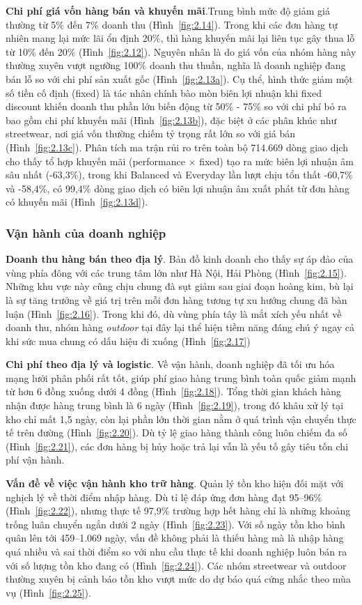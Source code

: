\documentclass{article}
\begin{document}
\textbf{Chi phí giá vốn hàng bán và khuyến mãi}.Trung bình mức độ giảm giá thường từ 5\% đến 7\% doanh thu (Hình~\ref{fig:2.14}). Trong khi các đơn hàng tự nhiên mang lại mức lãi ổn định 20\%, thì hàng khuyến mãi lại liên tục gây thua lỗ từ 10\% đến 20\% (Hình~\ref{fig:2.12}). Nguyên nhân là do giá vốn của nhóm hàng này thường xuyên vượt ngưỡng 100\% doanh thu thuần, nghĩa là doanh nghiệp đang bán lỗ so với chi phí sản xuất gốc (Hình~\ref{fig:2.13a}). Cụ thể, hình thức giảm một số tiền cố định (fixed) là tác nhân chính bào mòn biên lợi nhuận khi fixed discount khiến doanh thu phần lớn biến động từ 50\% - 75\% so với chi phí bỏ ra bao gồm chi phí khuyến mãi (Hình~\ref{fig:2.13b}), đặc biệt ở các phân khúc như streetwear, nơi giá vốn thường chiếm tỷ trọng rất lớn so với giá bán (Hình~\ref{fig:2.13c}). Phân tích ma trận rủi ro trên toàn bộ 714.669 dòng giao dịch cho thấy tổ hợp khuyến mãi (performance × fixed) tạo ra mức biên lợi nhuận âm sâu nhất (-63,3\%), trong khi Balanced và Everyday lần lượt chịu tổn thất -60,7\% và -58,4\%, có 99,4\% dòng giao dịch có biên lợi nhuận âm xuất phát từ đơn hàng có khuyến mãi (Hình~\ref{fig:2.13d}).
\subsubsection{Vận hành của doanh nghiệp}
\textbf{Doanh thu hàng bán theo địa lý}. Bản đồ kinh doanh cho thấy sự áp đảo của vùng phía đông với các trung tâm lớn như Hà Nội, Hải Phòng (Hình~\ref{fig:2.15}). Những khu vực này cũng chịu chung đà sụt giảm sau giai đoạn hoàng kim, bù lại là sự tăng trưởng về giá trị trên mỗi đơn hàng tương tự xu hướng chung đã bàn luận (Hình~\ref{fig:2.16}). Trong khi đó, dù vùng phía tây là mắt xích yếu nhất về doanh thu, nhóm hàng \textit{outdoor} tại đây lại thể hiện tiềm năng đáng chú ý ngay cả khi sức mua chung có dấu hiệu đi xuống (Hình~\ref{fig:2.17}) 

\textbf{Chi phí theo địa lý và logistic}. Về vận hành, doanh nghiệp đã tối ưu hóa mạng lưới phân phối rất tốt, giúp phí giao hàng trung bình toàn quốc giảm mạnh từ hơn 6 đồng xuống dưới 4 đồng (Hình~\ref{fig:2.18}). Tổng thời gian khách hàng nhận được hàng trung bình là 6 ngày (Hình~\ref{fig:2.19}), trong đó khâu xử lý tại kho chỉ mất 1,5 ngày, còn lại phần lớn thời gian nằm ở quá trình vận chuyển thực tế trên đường (Hình~\ref{fig:2.20}). Dù tỷ lệ giao hàng thành công luôn chiếm đa số (Hình~\ref{fig:2.21}), các đơn hàng bị hủy hoặc trả lại vẫn là yếu tố gây tiêu tốn chi phí vận hành.  

\textbf{Vấn đề về việc vận hành kho trữ hàng}. Quản lý tồn kho hiện đối mặt với nghịch lý về thời điểm nhập hàng. Dù tỉ lệ đáp ứng đơn hàng đạt 95–96\% (Hình~\ref{fig:2.22}), nhưng thực tế 97,9\% trường hợp hết hàng chỉ là những khoảng trống luân chuyển ngắn dưới 2 ngày (Hình~\ref{fig:2.23}). Với số ngày tồn kho bình quân lên tới 459–1.069 ngày, vấn đề không phải là thiếu hàng mà là nhập hàng quá nhiều và sai thời điểm so với nhu cầu thực tế khi doanh nghiệp luôn bán ra với số lượng tồn kho đang có (Hình~\ref{fig:2.24}). Các nhóm streetwear và outdoor thường xuyên bị cảnh báo tồn kho vượt mức do dự báo quá cứng nhắc theo mùa vụ (Hình~\ref{fig:2.25}). 
\end{document}
